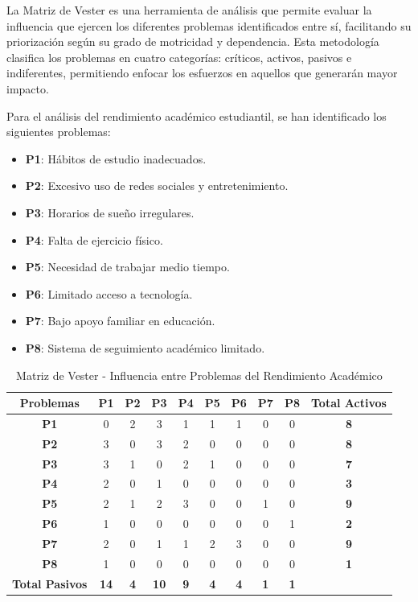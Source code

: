 \documentclass[12pt,letterpaper]{report}
\begin{document}
La Matriz de Vester es una herramienta de análisis que permite evaluar la influencia que ejercen los diferentes problemas identificados entre sí, facilitando su priorización según su grado de motricidad y dependencia. Esta metodología clasifica los problemas en cuatro categorías: críticos, activos, pasivos e indiferentes, permitiendo enfocar los esfuerzos en aquellos que generarán mayor impacto.

Para el análisis del rendimiento académico estudiantil, se han identificado los siguientes problemas:

\begin{itemize}
    \item \textbf{P1}: Hábitos de estudio inadecuados.
    \item \textbf{P2}: Excesivo uso de redes sociales y entretenimiento.
    \item \textbf{P3}: Horarios de sueño irregulares.
    \item \textbf{P4}: Falta de ejercicio físico.
    \item \textbf{P5}: Necesidad de trabajar medio tiempo.
    \item \textbf{P6}: Limitado acceso a tecnología.
    \item \textbf{P7}: Bajo apoyo familiar en educación.
    \item \textbf{P8}: Sistema de seguimiento académico limitado.
\end{itemize}

\begin{table}[H]
    \centering
    \begin{tabular}{|c|c|c|c|c|c|c|c|c|c|}
        \hline
        \textbf{Problemas} & \textbf{P1} & \textbf{P2} & \textbf{P3} & \textbf{P4} & \textbf{P5} & \textbf{P6} & \textbf{P7} & \textbf{P8} & \textbf{Total Activos} \\
        \hline
        \textbf{P1} & 0 & 2 & 3 & 1 & 1 & 1 & 0 & 0 & \textbf{8} \\
        \hline
        \textbf{P2} & 3 & 0 & 3 & 2 & 0 & 0 & 0 & 0 & \textbf{8} \\
        \hline
        \textbf{P3} & 3 & 1 & 0 & 2 & 1 & 0 & 0 & 0 & \textbf{7} \\
        \hline
        \textbf{P4} & 2 & 0 & 1 & 0 & 0 & 0 & 0 & 0 & \textbf{3} \\
        \hline
        \textbf{P5} & 2 & 1 & 2 & 3 & 0 & 0 & 1 & 0 & \textbf{9} \\
        \hline
        \textbf{P6} & 1 & 0 & 0 & 0 & 0 & 0 & 0 & 1 & \textbf{2} \\
        \hline
        \textbf{P7} & 2 & 0 & 1 & 1 & 2 & 3 & 0 & 0 & \textbf{9} \\
        \hline
        \textbf{P8} & 1 & 0 & 0 & 0 & 0 & 0 & 0 & 0 & \textbf{1} \\
        \hline
        \textbf{Total Pasivos} & \textbf{14} & \textbf{4} & \textbf{10} & \textbf{9} & \textbf{4} & \textbf{4} & \textbf{1} & \textbf{1} & \\
        \hline
    \end{tabular}
    \caption{Matriz de Vester - Influencia entre Problemas del Rendimiento Académico}
\end{table}
\end{document}
